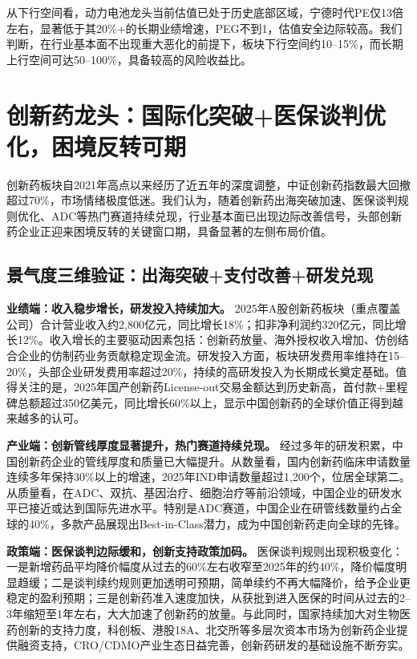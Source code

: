 \vspace{0.2cm}

从下行空间看，动力电池龙头当前估值已处于历史底部区域，宁德时代PE仅13倍左右，显著低于其20\%+的长期业绩增速，PEG不到1，估值安全边际较高。我们判断，在行业基本面不出现重大恶化的前提下，板块下行空间约10--15\%，而长期上行空间可达50--100\%，具备较高的风险收益比。

\vspace{0.5cm}

\section{创新药龙头：国际化突破+医保谈判优化，困境反转可期}

创新药板块自2021年高点以来经历了近五年的深度调整，中证创新药指数最大回撤超过70\%，市场情绪极度低迷。我们认为，随着创新药出海突破加速、医保谈判规则优化、ADC等热门赛道持续兑现，行业基本面已出现边际改善信号，头部创新药企业正迎来困境反转的关键窗口期，具备显著的左侧布局价值。

\subsection{景气度三维验证：出海突破+支付改善+研发兑现}

\textbf{业绩端：收入稳步增长，研发投入持续加大。} 2025年A股创新药板块（重点覆盖公司）合计营业收入约2,800亿元，同比增长18\%；扣非净利润约320亿元，同比增长12\%。收入增长的主要驱动因素包括：创新药放量、海外授权收入增加、仿创结合企业的仿制药业务贡献稳定现金流。研发投入方面，板块研发费用率维持在15--20\%，头部企业研发费用率超过20\%，持续的高研发投入为长期成长奠定基础。值得关注的是，2025年国产创新药License-out交易金额达到历史新高，首付款+里程碑总额超过350亿美元，同比增长60\%以上，显示中国创新药的全球价值正得到越来越多的认可。

\textbf{产业端：创新管线厚度显著提升，热门赛道持续兑现。} 经过多年的研发积累，中国创新药企业的管线厚度和质量已大幅提升。从数量看，国内创新药临床申请数量连续多年保持30\%以上的增速，2025年IND申请数量超过1,200个，位居全球第二。从质量看，在ADC、双抗、基因治疗、细胞治疗等前沿领域，中国企业的研发水平已接近或达到国际先进水平。特别是ADC赛道，中国企业在研管线数量约占全球的40\%，多款产品展现出Best-in-Class潜力，成为中国创新药走向全球的先锋。

\textbf{政策端：医保谈判边际缓和，创新支持政策加码。} 医保谈判规则出现积极变化：一是新增药品平均降价幅度从过去的60\%左右收窄至2025年的约40\%，降价幅度明显趋缓；二是谈判续约规则更加透明可预期，简单续约不再大幅降价，给予企业更稳定的盈利预期；三是创新药准入速度加快，从获批到进入医保的时间从过去的2--3年缩短至1年左右，大大加速了创新药的放量。与此同时，国家持续加大对生物医药创新的支持力度，科创板、港股18A、北交所等多层次资本市场为创新药企业提供融资支持，CRO/CDMO产业生态日益完善，创新药研发的基础设施不断夯实。


